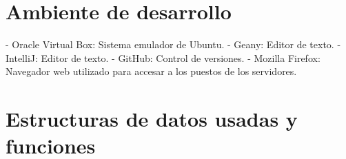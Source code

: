 \documentclass{report}
\begin{document}
\section{Ambiente de desarrollo}
- Oracle Virtual Box: \newline Sistema emulador de Ubuntu. \newline
\newline
- Geany: \newline Editor de texto. \newline
\newline
- IntelliJ: \newline Editor de texto. \newline
\newline
- GitHub: \newline Control de versiones. \newline
\newline
- Mozilla Firefox: \newline Navegador web utilizado para accesar a los puestos de los servidores. \newline
\newline
\newpage
\section{Estructuras de datos usadas y funciones}
\end{document}
